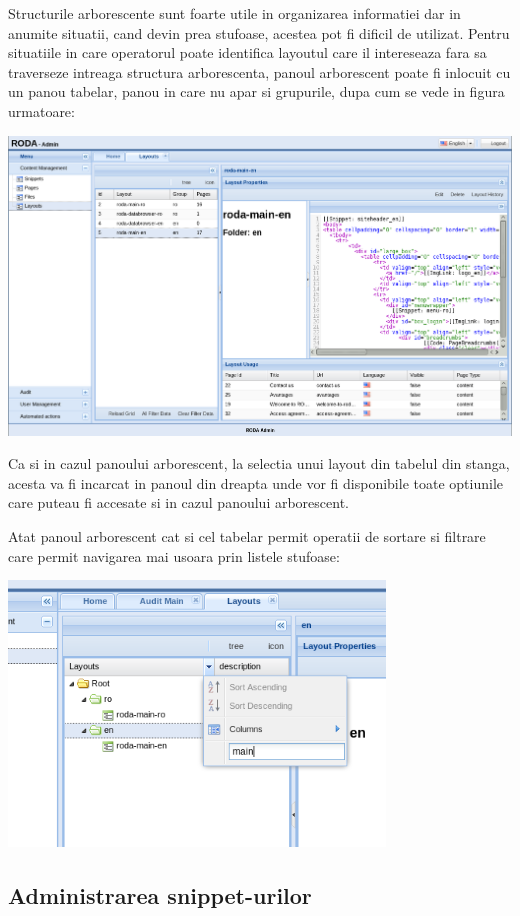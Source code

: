 Structurile arborescente sunt foarte utile in organizarea informatiei
dar in anumite situatii, cand devin prea stufoase, acestea pot fi
dificil de utilizat. Pentru situatiile in care operatorul poate identifica
layoutul care il intereseaza fara sa traverseze intreaga structura
arborescenta, panoul arborescent poate fi inlocuit cu un panou tabelar,
panou in care nu apar si grupurile, dupa cum se vede in figura urmatoare:

\includegraphics[width=15cm]{cms/backend/layout/cmslayout9}

Ca si in cazul panoului arborescent, la selectia unui layout din tabelul
din stanga, acesta va fi incarcat in panoul din dreapta unde vor fi
disponibile toate optiunile care puteau fi accesate si in cazul panoului
arborescent. 

Atat panoul arborescent cat si cel tabelar permit operatii de sortare
si filtrare care permit navigarea mai usoara prin listele stufoase:

\includegraphics[width=10cm]{cms/backend/layout/cmslayout10}


\subsection{Administrarea snippet-urilor}

